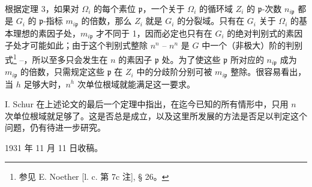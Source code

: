 根据定理 3，如果对 \(\Omega_i\) 的每个素位 \(\mathfrak p\)，一个关于 \(\Omega_i\) 的循环域 \(Z_i\) 的 \(\mathfrak p\)-次数 \(n_{i\mathfrak p}\) 都是 \(G_i\) 的 \(\mathfrak p\)-指标 \(m_{i\mathfrak p}\) 的倍数，那么 \(Z_i\) 就是 \(G_i\) 的分裂域。只有在 \(G_i\) 关于 \(\Omega_i\) 的基本理想的素因子处，\(m_{i\mathfrak p}\) 才不同于 1，因而必定也只有在 \(G_i\) 的绝对判别式的素因子处才可能如此；由于这个判别式整除 \(n^n\) -- \(n^n\) 是 \(G\) 中一个（非极大）阶的判别式\footnote{参见 E. Noether [l. c. 第 7c 注], § 26。} --，所以至多只会发生在 \(n\) 的素因子 \(\mathfrak p\) 处。为了使这些 \(\mathfrak p\) 所对应的 \(n_{i\mathfrak p}\) 成为 \(m_{i\mathfrak p}\) 的倍数，只需规定这些 \(\mathfrak p\) 在 \(Z_i\) 中的分歧阶分别可被 \(m_{i\mathfrak p}\) 整除。很容易看出，当 \(h\) 足够大时，\(n^h\) 次单位根域就能满足这一要求。

I. Schur 在上述论文的最后一个定理中指出，在迄今已知的所有情形中，只用 \(n\) 次单位根域就足够了。这是否总是成立，以及这里所发展的方法是否足以判定这个问题，仍有待进一步研究。

\begin{center}
1931 年 11 月 11 日收稿。
\end{center}

\clearpage

\setcounter{footnote}{0}

